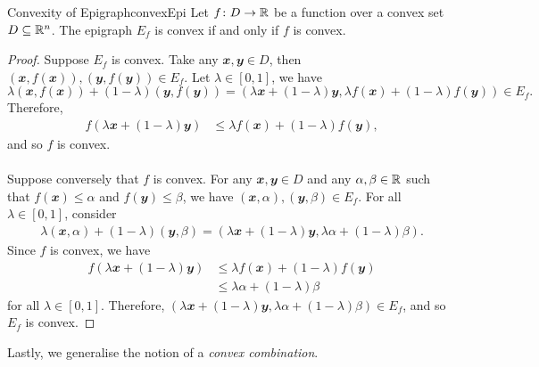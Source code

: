 \documentclass[math, code]{amznotes}
\theoremstyle{remark}
\begin{document}
\begin{probox}{Convexity of Epigraph}{convexEpi}
    Let $f \colon D \to \mathbb{R}$ be a function over a convex set $D \subseteq \mathbb{R}^n$. The epigraph $E_f$ is convex if and only if $f$ is convex.
    \tcblower   
    \begin{proof}
        Suppose $E_f$ is convex. Take any $\mathbfit{x}, \mathbfit{y} \in D$, then $(\mathbfit{x}, f(\mathbfit{x})), (\mathbfit{y}, f(\mathbfit{y})) \in E_f$. Let $\lambda \in [0, 1]$, we have
        \begin{displaymath}
            \lambda(\mathbfit{x}, f(\mathbfit{x})) + (1 - \lambda)(\mathbfit{y}, f(\mathbfit{y})) = (\lambda\mathbfit{x} + (1 - \lambda)\mathbfit{y}, \lambda f(\mathbfit{x}) + (1 - \lambda)f(\mathbfit{y})) \in E_f.
        \end{displaymath}
        Therefore, 
        \begin{align*}
            f\left(\lambda\mathbfit{x} + (1 - \lambda)\mathbfit{y}\right) & \leq \lambda f(\mathbfit{x}) + (1 - \lambda)f(\mathbfit{y}),
        \end{align*}
        and so $f$ is convex.
        \\\\
        Suppose conversely that $f$ is convex. For any $\mathbfit{x}, \mathbfit{y} \in D$ and any $\alpha, \beta \in \mathbb{R}$ such that $f(\mathbfit{x}) \leq \alpha$ and $f(\mathbfit{y}) \leq \beta$, we have $(\mathbfit{x}, \alpha), (\mathbfit{y}, \beta) \in E_f$. For all $\lambda \in [0, 1]$, consider
        \begin{align*}
            \lambda(\mathbfit{x}, \alpha) + (1 - \lambda)(\mathbfit{y}, \beta) = (\lambda\mathbfit{x} + (1 - \lambda)\mathbfit{y}, \lambda\alpha + (1 - \lambda)\beta).
        \end{align*}
        Since $f$ is convex, we have
        \begin{align*}
            f\left(\lambda\mathbfit{x} + (1 - \lambda)\mathbfit{y}\right) & \leq \lambda f(\mathbfit{x}) + (1 - \lambda)f(\mathbfit{y}) \\
            & \leq \lambda\alpha + (1 - \lambda)\beta
        \end{align*}
        for all $\lambda \in [0, 1]$. Therefore, $(\lambda\mathbfit{x} + (1 - \lambda)\mathbfit{y}, \lambda\alpha + (1 - \lambda)\beta) \in E_f$, and so $E_f$ is convex.
    \end{proof}
\end{probox}
Lastly, we generalise the notion of a \textit{convex combination}.
\end{document}
